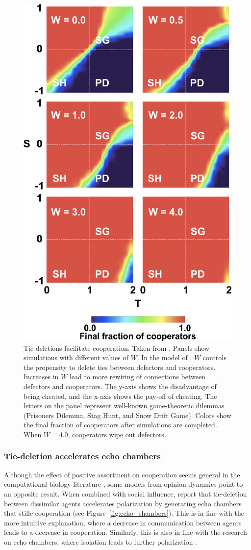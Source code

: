 \documentclass[11pt]{article}
\begin{document}
\begin{figure}[H]
   \centering
   \includegraphics[width=.4\linewidth]{../plots/references/santos.png}
 \caption{Tie-deletions facilitate cooperation. Taken from \protect{}. Panels show simulations with different values of $W$. In the model of \protect{}, $W$ controls the propensity to delete ties between defectors and cooperators. Increases in $W$ lead to more rewiring of connections between defectors and cooperators. The y-axis shows the disadvantage of being cheated, and the x-axis shows the pay-off of cheating. The letters on the panel represent well-known game-theoretic dilemmas (Prisoners Dilemma, Stag Hunt, and Snow Drift Game). Colors show the final fraction of cooperators after simulations are completed. When $W = 4.0$, cooperators wipe out defectors. }
 \label{fig:santos}
\end{figure}

\subsubsection{Tie-deletion accelerates echo chambers}

\noindent Although the effect of positive assortment on cooperation seems general in the computational biology literature \cite{boyd_coordinated_2010,dakin_dynamic_2018,melamed_strong_2016,pepper_mechanism_2002}, some models from opinion dynamics point to an opposite result. When combined with social influence,  report that tie-deletion between dissimilar agents accelerates polarization by generating echo chambers that stifle cooperation (see Figure~\ref{fig:echo_chambers}). This is in line with the more intuitive explanation, where a decrease in communication between agents leads to a decrease in cooperation. Similarly, this is also in line with the research on echo chambers, where isolation leads to further polarization \cite{tsai_echo_2020, del_vicario_echo_2016}. 
\end{document}
